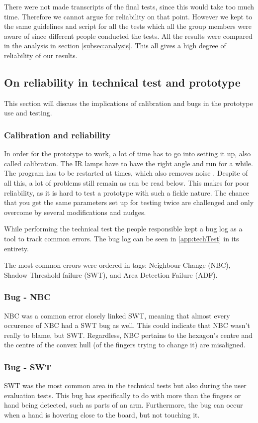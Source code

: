There were not made transcripts of the final tests, since this would take too much time. Therefore we cannot argue for reliability on that point. However we kept to the same guidelines and script for all the tests which all the group members were aware of since different people conducted the tests. All the results were compared in the analysis in section \ref{subsec:analysis}. This all gives a high degree of reliability of our results. 

\subsection{On reliability in technical test and prototype}
This section will discuss the implications of calibration and bugs in the prototype use and testing. 
\subsubsection*{Calibration and reliability}
In order for the prototype to work, a lot of time has to go into setting it up, also called calibration. The IR lamps have to have the right angle and run for a while. The program has to be restarted at times, which also removes noise . Despite of all this, a lot of problems still remain as can be read below. This makes for poor reliability, as it is hard to test a prototype with such a fickle nature. The chance that you get the same parameters set up for testing twice are challenged and only overcome by several modifications and nudges.

While performing the technical test the people responsible kept a bug log as a tool to track common errors. The bug log can be seen in \ref{app:techTest}  in its entirety.

The most common errors were ordered in tags: Neighbour Change (NBC), Shadow Threshold failure (SWT), and Area Detection Failure (ADF). 
\subsubsection*{Bug - NBC} 
NBC was a common error closely linked SWT, meaning that almost every occurence of NBC had a SWT bug as well. This could indicate that NBC wasn't really to blame, but SWT. Regardless, NBC pertains to the hexagon's centre and the centre of the convex hull (of the fingers trying to change it) are misaligned.
\subsubsection*{Bug - SWT} 
SWT was the most common area in the technical tests but also during the user evaluation tests. This bug has specifically to do with more than the fingers or hand being detected, such as parts of an arm. Furthermore, the bug can occur when a hand is hovering close to the board, but not touching it.
